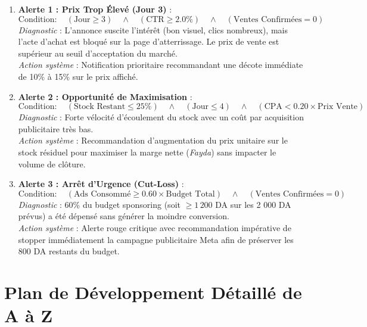 \documentclass[11pt,a4paper]{article}
\begin{document}
\begin{enumerate}[leftmargin=*]
    \item \textbf{Alerte 1 : \og Prix Trop Élevé \fg{} (Jour 3)} :
    \begin{equation}
        \text{Condition} : \quad (\text{Jour} \ge 3) \quad \land \quad (\text{CTR} \ge 2.0\%) \quad \land \quad (\text{Ventes Confirmées} = 0)
    \end{equation}
    \textit{Diagnostic} : L'annonce suscite l'intérêt (bon visuel, clics nombreux), mais l'acte d'achat est bloqué sur la page d'atterrissage. Le prix de vente est supérieur au seuil d'acceptation du marché.\\
    \textit{Action système} : Notification prioritaire recommandant une décote immédiate de 10\% à 15\% sur le prix affiché.

    \item \textbf{Alerte 2 : \og Opportunité de Maximisation \fg{}} :
    \begin{equation}
        \text{Condition} : \quad (\text{Stock Restant} \le 25\%) \quad \land \quad (\text{Jour} \le 4) \quad \land \quad (\text{CPA} < 0.20 \times \text{Prix Vente})
    \end{equation}
    \textit{Diagnostic} : Forte vélocité d'écoulement du stock avec un coût par acquisition publicitaire très bas.\\
    \textit{Action système} : Recommandation d'augmentation du prix unitaire sur le stock résiduel pour maximiser la marge nette (\textit{Fayda}) sans impacter le volume de clôture.

    \item \textbf{Alerte 3 : \og Arrêt d'Urgence (Cut-Loss) \fg{}} :
    \begin{equation}
        \text{Condition} : \quad (\text{Ads Consommé} \ge 0.60 \times \text{Budget Total}) \quad \land \quad (\text{Ventes Confirmées} = 0)
    \end{equation}
    \textit{Diagnostic} : 60\% du budget sponsoring (soit $\ge 1\,200$ DA sur les 2 000 DA prévus) a été dépensé sans générer la moindre conversion.\\
    \textit{Action système} : Alerte rouge critique avec recommandation impérative de stopper immédiatement la campagne publicitaire Meta afin de préserver les 800 DA restants du budget.
\end{enumerate}

\section{Plan de Développement Détaillé de A à Z}
\end{document}
